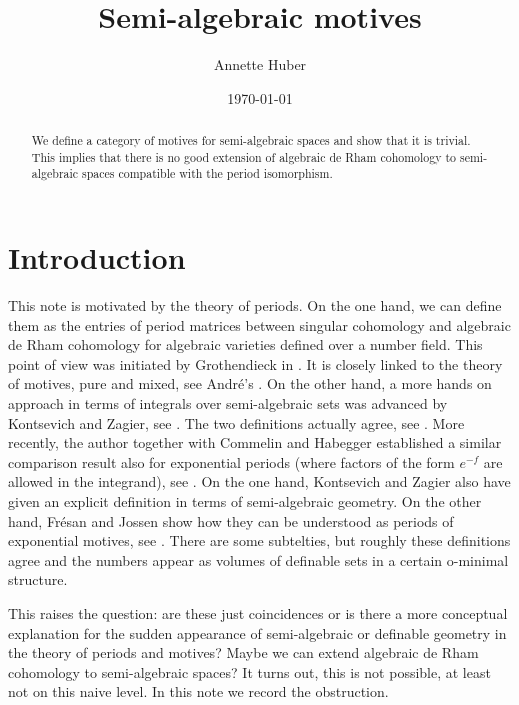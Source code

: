 \documentclass[11pt,a4paper]{amsart}
\theoremstyle{definition}
\begin{document}
\title{Semi-algebraic motives}
\author{Annette Huber}
\date{\today}
\address{Annette Huber, Math. Institut, Universit\"at Freiburg, Ernst-Zermelo-Str.~1, 79104 Freiburg, Germany}

\begin{abstract}
We define a category of motives for semi-algebraic spaces and show that
it is trivial. This implies that there is no good extension of algebraic de Rham cohomology to semi-algebraic spaces compatible with the period isomorphism.  
\end{abstract}
\maketitle


\section*{Introduction}

This note is motivated by the theory of periods. On the one hand, we can define them as the entries of period matrices between singular cohomology and algebraic de Rham cohomology for algebraic varieties defined over a number field. This point of view was initiated by Grothendieck in \cite{grothendieck_66}. It is closely linked to the theory of motives, pure and mixed, see Andr\'e's \cite{andre2}.
On the other hand, a more hands on approach in terms of integrals over semi-algebraic sets was advanced by Kontsevich and Zagier, see \cite{kontsevich_zagier}. The two definitions actually agree, see \cite[Chapter~12]{period-buch}. More recently, the author together with Commelin and Habegger established a similar comparison result also for exponential periods (where factors of the form 
$e^{-f}$ are allowed in the integrand), see \cite{expperI, expPerII}. On the one hand, Kontsevich and Zagier also have given an explicit definition in terms of semi-algebraic geometry. 
On the other hand, Fr\'esan and Jossen show how they can be understood as periods of exponential motives, see \cite{fresan-jossen}. There are some subtelties, but roughly these definitions agree and the numbers appear as volumes of definable sets in a certain o-minimal structure.

This raises the question: are these just coincidences or is there a more conceptual explanation for the sudden appearance of semi-algebraic or definable geometry in the theory of periods and motives? Maybe we can extend algebraic de Rham cohomology to semi-algebraic spaces? It turns out, this is not possible, at least not on this naive level. 
In this note we record the obstruction. 
\end{document}
